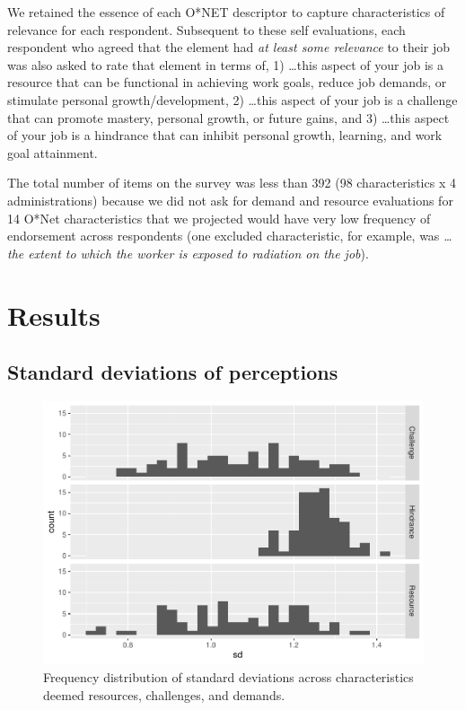 \documentclass[
  english,
  man]{apa6}
\begin{document}
We retained the essence of each O*NET descriptor to capture characteristics of relevance for each respondent. Subsequent to these self evaluations, each respondent who agreed that the element had \emph{at least some relevance} to their job was also asked to rate that element in terms of, 1) \ldots this aspect of your job is a resource that can be functional in achieving work goals, reduce job demands, or stimulate personal growth/development, 2) \ldots this aspect of your job is a challenge that can promote mastery, personal growth, or future gains, and 3) \ldots this aspect of your job is a hindrance that can inhibit personal growth, learning, and work goal attainment.

The total number of items on the survey was less than 392 (98 characteristics x 4 administrations) because we did not ask for demand and resource evaluations for 14 O*Net characteristics that we projected would have very low frequency of endorsement across respondents (one excluded characteristic, for example, was \emph{\ldots the extent to which the worker is exposed to radiation on the job}).

\hypertarget{results}{%
\section{Results}\label{results}}

\hypertarget{standard-deviations-of-perceptions}{%
\subsection{Standard deviations of perceptions}\label{standard-deviations-of-perceptions}}

\begin{figure}
\centering
\includegraphics{Submission_files/figure-latex/overallhist-1.pdf}
\caption{\label{fig:overallhist}Frequency distribution of standard deviations across characteristics deemed resources, challenges, and demands.}
\end{figure}
\end{document}
